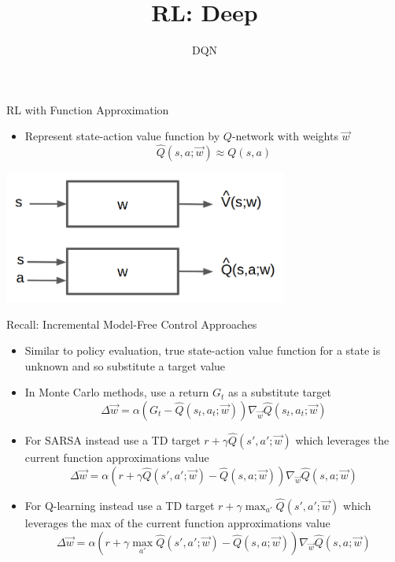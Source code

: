 


\title[RL: Deep Reinforcement Learning]{RL: Deep}
\subtitle{DQN}




	
	\maketitle

\begin{frame}[c]{RL with Function Approximation}
	
\begin{itemize}
	\item Represent state-action value function by $Q$-network with weights $\vec{w}$
	$$\hat{Q}(s,a;\vec{w}) \approx Q(s,a)$$
\end{itemize}

\centering
\includegraphics[width=0.7\textwidth]{../w05_function_approx/images/vfa.png}


\end{frame}
\begin{frame}[c]{Recall: Incremental Model-Free Control Approaches}
	
\begin{itemize}
	\item Similar to policy evaluation, true state-action value function for a state is unknown and so substitute a target value
	\item In Monte Carlo methods, use a return $G_t$ as a substitute target
	$$\Delta \vec{w} = \alpha(G_t - \hat{Q}(s_t,a_t; \vec{w})) \nabla_{\vec{w}} \hat{Q}(s_t, a_t; \vec{w}) $$
	\item For SARSA instead use a TD target $r+ \gamma \hat{Q}(s', a'; \vec{w})$ which leverages the current function approximations value
	$$\Delta \vec{w} = \alpha (r + \gamma \hat{Q}(s',a';\vec{w}) - \hat{Q}(s,a;\vec{w})) \nabla_{\vec{w}}\hat{Q}(s,a;\vec{w}) $$
	\item For Q-learning instead use a TD target $r + \gamma \max_{a'} \hat{Q}(s',a';\vec{w})$ which leverages the max of the current function approximations value
	$$\Delta \vec{w} = \alpha (r + \gamma \max_{a'} \hat{Q}(s',a';\vec{w}) - \hat{Q}(s,a;\vec{w})) \nabla_{\vec{w}}\hat{Q}(s,a;\vec{w}) $$
\end{itemize}
	
\end{frame}
